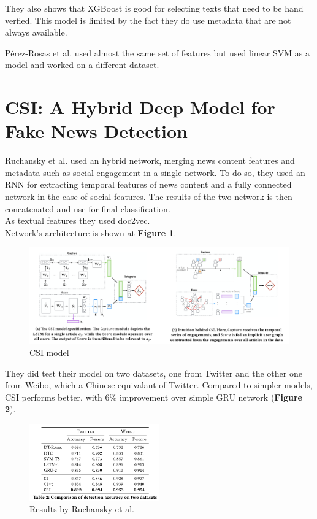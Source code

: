 They also shows that XGBoost is good for selecting texts that need to be hand verfied. This model is limited by the fact they do use metadata that are not always available. 

P\'erez-Rosas et al.\cite{Perez-Rosas2017} used almost the same set of features but used linear SVM as a model and worked on a different dataset.

\section{CSI: A Hybrid Deep Model for Fake News Detection}
Ruchansky et al.\cite{Ruchansky2017} used an hybrid network, merging news content features and metadata such as social engagement in a single network. To do so, they used an RNN for extracting temporal features of news content and a fully connected network in the case of social features. The results of the two network is then concatenated and use for final classification. \\

As textual features they used doc2vec\cite{Le2014}. \\

Network's architecture is shown at \textbf{Figure \ref{fig:chap1:Ruchansky}}.

\begin{figure}[h]
	\centering
	\includegraphics[width=\textwidth]{images/chap1_bis/rev2.png}
	\caption{CSI model}
	\label{fig:chap1:Ruchansky}
\end{figure}

They did test their model on two datasets, one from Twitter and the other one from Weibo, which a Chinese equivalant of Twitter. Compared to simpler models, CSI performs better, with $6\%$ improvement over simple GRU network (\textbf{Figure \ref{fig:chap1:Ruchansky2}}). 

\begin{figure}[h]
	\centering
	\includegraphics[width=0.5\textwidth]{images/chap1_bis/rev3.png}
	\caption{Results by Ruchansky et al. }
	\label{fig:chap1:Ruchansky2}
\end{figure}

